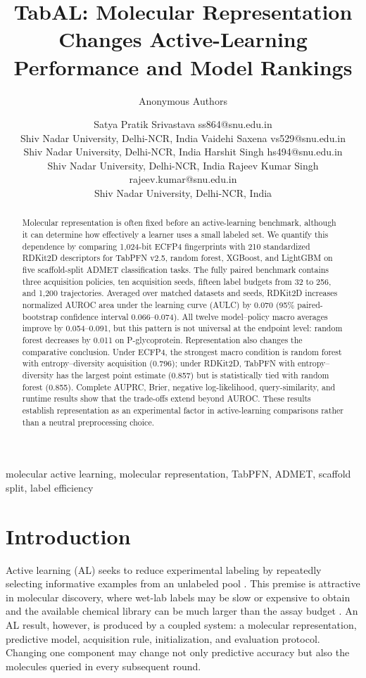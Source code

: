 \documentclass[twoside,11pt]{article}
\title{TabAL: Molecular Representation Changes Active-Learning Performance and Model Rankings}
\author{\name Anonymous Authors}
\author{\name Satya Pratik Srivastava \email ss864@snu.edu.in \\
\addr Shiv Nadar University, Delhi-NCR, India
\AND
\name Vaidehi Saxena \email vs529@snu.edu.in \\
\addr Shiv Nadar University, Delhi-NCR, India
\AND
\name Harshit Singh \email hs494@snu.edu.in \\
\addr Shiv Nadar University, Delhi-NCR, India
\AND
\name Rajeev Kumar Singh \email rajeev.kumar@snu.edu.in \\
\addr Shiv Nadar University, Delhi-NCR, India}
\begin{document}
\maketitle

\begin{abstract}
Molecular representation is often fixed before an active-learning benchmark, although it can determine how effectively a learner uses a small labeled set. We quantify this dependence by comparing 1,024-bit ECFP4 fingerprints with 210 standardized RDKit2D descriptors for TabPFN v2.5, random forest, XGBoost, and LightGBM on five scaffold-split ADMET classification tasks. The fully paired benchmark contains three acquisition policies, ten acquisition seeds, fifteen label budgets from 32 to 256, and 1,200 trajectories. Averaged over matched datasets and seeds, RDKit2D increases normalized AUROC area under the learning curve (AULC) by 0.070 (95\% paired-bootstrap confidence interval 0.066--0.074). All twelve model--policy macro averages improve by 0.054--0.091, but this pattern is not universal at the endpoint level: random forest decreases by 0.011 on P-glycoprotein. Representation also changes the comparative conclusion. Under ECFP4, the strongest macro condition is random forest with entropy--diversity acquisition (0.796); under RDKit2D, TabPFN with entropy--diversity has the largest point estimate (0.857) but is statistically tied with random forest (0.855). Complete AUPRC, Brier, negative log-likelihood, query-similarity, and runtime results show that the trade-offs extend beyond AUROC. These results establish representation as an experimental factor in active-learning comparisons rather than a neutral preprocessing choice.
\end{abstract}

\begin{keywords}
molecular active learning, molecular representation, TabPFN, ADMET, scaffold split, label efficiency
\end{keywords}

\section{Introduction}
Active learning (AL) seeks to reduce experimental labeling by repeatedly selecting informative examples from an unlabeled pool \citep{settles2009active}. This premise is attractive in molecular discovery, where wet-lab labels may be slow or expensive to obtain and the available chemical library can be much larger than the assay budget \citep{graff2021molpal}. An AL result, however, is produced by a coupled system: a molecular representation, predictive model, acquisition rule, initialization, and evaluation protocol. Changing one component may change not only predictive accuracy but also the molecules queried in every subsequent round.
\end{document}
